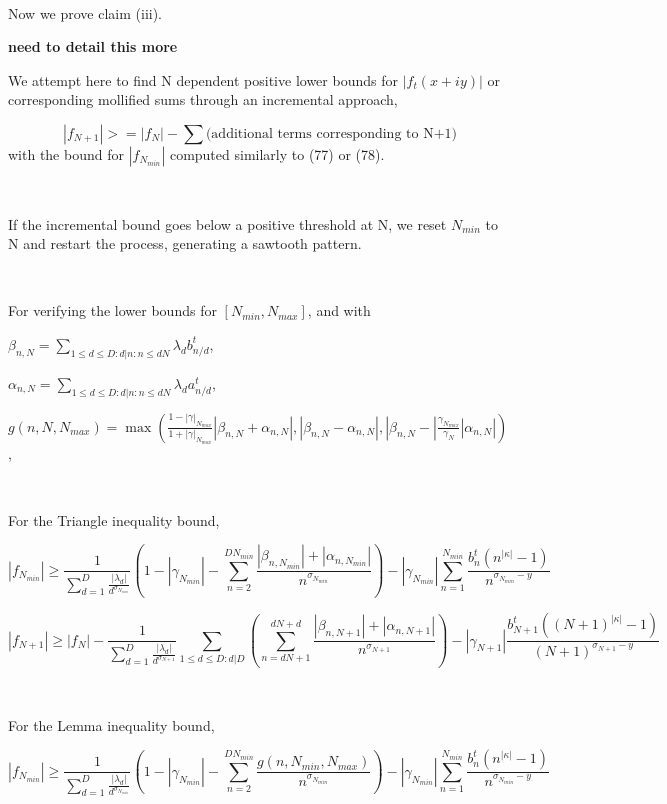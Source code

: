 $ $
 

Now we prove claim (iii).

{\bf need to detail this more}

We attempt here to find N dependent positive lower bounds for $|f_{t}(x+iy)|$ or corresponding mollified sums through an incremental approach,

$$ |f_{N+1}| >= |f_{N}| - \sum \textrm{(additional terms corresponding to N+1)}$$
with the bound for $|f_{N_{min}}|$ computed similarly to (77) or (78).

$ $

If the incremental bound goes below a positive threshold at N, we reset $N_{min}$ to N and restart the process, generating a sawtooth pattern.

$ $

For verifying the lower bounds for $[N_{min},N_{max}]$, and with

$\beta_{n,N} = \sum\limits_{1 \leq d \leq D:d|n:n \leq dN} \lambda_{d} b_{n/d}^{t}$, 

$\alpha_{n,N} = \sum\limits_{1 \leq d \leq D:d|n:n \leq dN} \lambda_{d} a_{n/d}^{t}$,

$g(n,N,N_{max}) = \max(\frac{1-|\gamma|_{N_{max}}}{1+|\gamma|_{N_{max}}} |\beta_{n,N} + \alpha_{n,N}|, |\beta_{n,N} - \alpha_{n,N}|,  |\beta_{n,N} - |\frac{\gamma_{N_{max}}}{\gamma_{N}}| \alpha_{n,N}|)$,

$ $

For the Triangle inequality bound,

$$|f_{N_{min}}| \geq \frac{1}{\sum_{d=1}^D \frac{|\lambda_d|}{d^{\sigma_{N_{min}}}}} (1 - |\gamma_{N_{min}}| - \sum\limits_{n=2}^{DN_{min}} \frac{|\beta_{n,N_{min}}| + |\alpha_{n,N_{min}}|}{n^{\sigma_{N_{min}}}}) - |\gamma_{N_{min}}| \sum_{n=1}^{N_{min}} \frac{b_n^t (n^{|\kappa|} - 1)}{n^{\sigma_{N_{min}}-y}}$$


$$|f_{N+1}| \geq |f_{N}| - \frac{1}{\sum_{d=1}^D \frac{|\lambda_d|}{d^{\sigma_{N+1}}}} \sum\limits_{1 \leq d \leq D:d|D}(\sum\limits_{n=dN+1}^{dN+d} \frac{|\beta_{n,N+1}| + |\alpha_{n,N+1}|}{n^{\sigma_{N+1}}}) - |\gamma_{N+1}| \frac{b_{N+1}^t ({(N+1)}^{|\kappa|} - 1)}{(N+1)^{\sigma_{N+1}-y}}$$

$ $

For the Lemma inequality bound,

$$|f_{N_{min}}| \geq \frac{1}{\sum_{d=1}^D \frac{|\lambda_d|}{d^{\sigma_{N_{min}}}}} (1 - |\gamma_{N_{min}}| - \sum\limits_{n=2}^{DN_{min}}  \frac{g(n,N_{min},N_{max})}{n^{\sigma_{N_{min}}}} ) - |\gamma_{N_{min}}| \sum_{n=1}^{N_{min}} \frac{b_n^t (n^{|\kappa|} - 1)}{n^{\sigma_{N_{min}}-y}}$$


